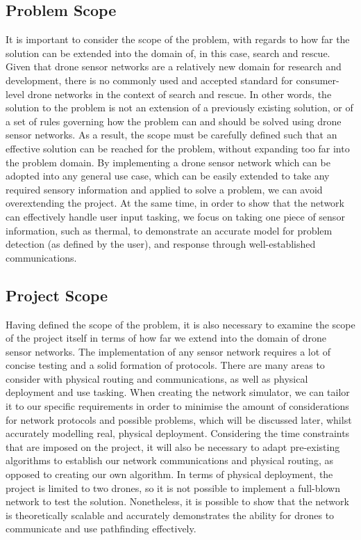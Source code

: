 \documentclass[12pt,a4paper,twoside]{report}
\begin{document}
		\subsection{Problem Scope}
		It is important to consider the scope of the problem, with regards to how far the solution can be extended into the domain of, in this case, search and rescue. Given that drone sensor networks are a relatively new domain for research and development, there is no commonly used and accepted standard for consumer-level drone networks in the context of search and rescue. In other words, the solution to the problem is not an extension of a previously existing solution, or of a set of rules governing how the problem can and should be solved using drone sensor networks.
As a result, the scope must be carefully defined such that an effective solution can be reached for the problem, without expanding too far into the problem domain. By implementing a drone sensor network which can be adopted into any general use case, which can be easily extended to take any required sensory information and applied to solve a problem, we can avoid overextending the project. At the same time, in order to show that the network can effectively handle user input tasking, we focus on taking one piece of sensor information, such as thermal, to demonstrate an accurate model for problem detection (as defined by the user), and response through well-established communications. 
		\subsection{Project Scope}
		Having defined the scope of the problem, it is also necessary to examine the scope of the project itself in terms of how far we extend into the domain of drone sensor networks. The implementation of any sensor network requires a lot of concise testing and a solid formation of protocols. There are many areas to consider with physical routing and communications, as well as physical deployment and use tasking. When creating the network simulator, we can tailor it to our specific requirements in order to minimise the amount of considerations for network protocols and possible problems, which will be discussed later, whilst accurately modelling real, physical deployment. 
Considering the time constraints that are imposed on the project, it will also be necessary to adapt pre-existing algorithms to establish our network communications and physical routing, as opposed to creating our own algorithm. In terms of physical deployment, the project is limited to two drones, so it is not possible to implement a full-blown network to test the solution. Nonetheless, it is possible to show that the network is theoretically scalable and accurately demonstrates the ability for drones to communicate and use pathfinding effectively.
\end{document}
